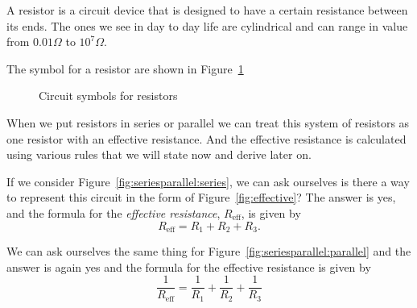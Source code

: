 \documentclass[12pt]{article}
\begin{document}
A resistor is a circuit device that is designed to have a certain
resistance between its ends. The ones we see in day to day life are
cylindrical and can range in value from \(0.01 \Omega \) to
\(10^7 \Omega \).

The symbol for a resistor are shown in Figure~\ref{fig:resistors}

\begin{figure}[h]
  \centering
{}\qquad
{}
\caption{Circuit symbols for resistors}\label{fig:resistors}
\end{figure}

When we put resistors in series or parallel we can treat this system of resistors as one resistor with an effective resistance. And the effective resistance is calculated using various rules that we will state now and derive later on.

If we consider Figure~\ref{fig:seriesparallel:series}, we can ask ourselves is there a way to represent this circuit in the form of Figure~\ref{fig:effective}? The answer is yes, and the formula for the \emph{effective resistance}, $R_{\text{eff}}$, is given by
$$R_{\text{eff}} = R_1 + R_2 + R_3.$$

We can ask ourselves the same thing for Figure~\ref{fig:seriesparallel:parallel} and the answer is again yes and the formula for the effective resistance is given by
$$\frac{1}{R_{\text{eff}}} = \frac{1}{R_1}+ \frac{1}{R_2}+ \frac{1}{R_3}$$
\end{document}

